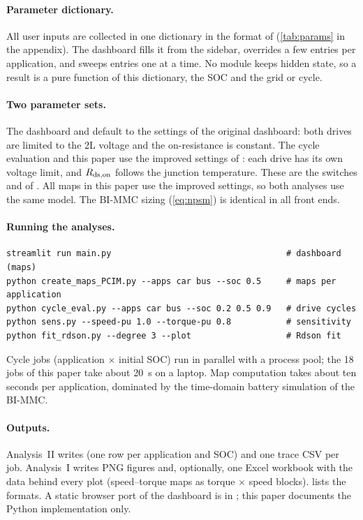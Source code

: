 \paragraph{Parameter dictionary.} All user inputs are collected in one dictionary in the format of  (\cref{tab:params} in the appendix). The dashboard fills it from the sidebar,  overrides a few entries per application, and  sweeps entries one at a time. No module keeps hidden state, so a result is a pure function of this dictionary, the SOC and the grid or cycle.

\paragraph{Two parameter sets.} The dashboard and  default to the settings of the original dashboard: both drives are limited to the 2L voltage and the on-resistance is constant. The cycle evaluation and this paper use the improved settings of : each drive has its own voltage limit, and $R_\mathrm{ds,on}$ follows the junction temperature. These are the switches  and  of . All maps in this paper use the improved settings, so both analyses use the same model. The BI-MMC sizing (\cref{eq:npsm}) is identical in all front ends.

\paragraph{Running the analyses.}
\begin{lstlisting}[numbers=none, language={}]
streamlit run main.py                                   # dashboard (maps)
python create_maps_PCIM.py --apps car bus --soc 0.5     # maps per application
python cycle_eval.py --apps car bus --soc 0.2 0.5 0.9   # drive cycles
python sens.py --speed-pu 1.0 --torque-pu 0.8           # sensitivity
python fit_rdson.py --degree 3 --plot                   # Rdson fit
\end{lstlisting}
Cycle jobs (application $\times$ initial SOC) run in parallel with a process pool; the 18 jobs of this paper take about \SI{20}{\second} on a laptop. Map computation takes about ten seconds per application, dominated by the time-domain battery simulation of the BI-MMC.

\paragraph{Outputs.} Analysis~II writes  (one row per application and SOC) and one trace CSV per job. Analysis~I writes PNG figures and, optionally, one Excel workbook with the data behind every plot (speed--torque maps as torque $\times$ speed blocks).  lists the formats. A static browser port of the dashboard is in ; this paper documents the Python implementation only.
